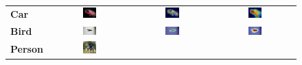 \begin{figure}[ht]
\begin{tcolorbox}[colframe=black!60, colback=white, boxrule=0.8pt, arc=2pt, left=2pt, right=2pt, top=2pt, bottom=2pt]
\begin{tabular}{m{2.5cm} c c c}
    \\
    \textbf{Car}
    & \includegraphics[width=0.18\textwidth,height=0.18\textwidth]{figures/originals/2007_006277}
    & \includegraphics[width=0.18\textwidth,height=0.18\textwidth]{figures/test_cams/weclip/2007_006277_6}
    & \includegraphics[width=0.18\textwidth,height=0.18\textwidth]{figures/test_cams/ours/2007_006277_6}
    \\
    \textbf{Bird}
    & \includegraphics[width=0.18\textwidth,height=0.18\textwidth]{figures/originals/2007_001289}
    & \includegraphics[width=0.18\textwidth,height=0.18\textwidth]{figures/test_cams/weclip/2007_001289_2}
    & \includegraphics[width=0.18\textwidth,height=0.18\textwidth]{figures/test_cams/ours/2007_001289_2}
    \\
    \textbf{Person}
    & \includegraphics[width=0.18\textwidth,height=0.18\textwidth]{figures/originals/2007_000783}

\end{tabular}
\end{tcolorbox}
\end{figure}
